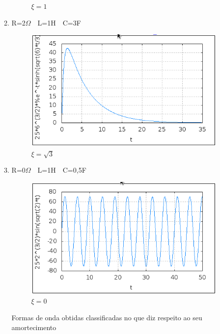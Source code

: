 \documentclass[titlepage, a4paper, 11pt, reqno, openany]{report}
\begin{document}
\begin{enumerate}
\begin{enumerate}
\begin{figure}[H]
\caption{$\xi=1$}
\label{figura 21}
\end{figure}\par
\item
R=2$\Omega$\ \  L=1H\ \  C=3F\par
\begin{figure}[H]
\centering
\includegraphics[scale=0.8]{./image/image_e.png}
\caption{$\xi=\sqrt{3}$}
\label{figura 22}
\end{figure}\par
\item
R=0$\Omega$\ \  L=1H\ \  C=0,5F\par
\begin{figure}[H]
\centering
\includegraphics[scale=0.8]{./image/image_f.png}
\caption{$\xi=0$}
\label{figura 23}
\end{figure}\par
%
{Formas  de onda  obtidas classificadas  no que diz respeito  ao seu amortecimento }\par

\end{enumerate}
\end{enumerate}
\end{document}

